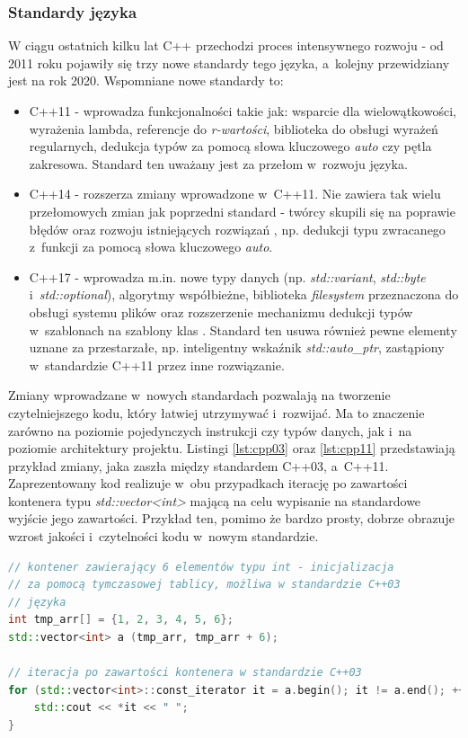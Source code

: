 \subsubsection*{Standardy języka}
W ciągu ostatnich kilku lat C++ przechodzi proces intensywnego rozwoju - od 2011 roku pojawiły się trzy nowe standardy tego języka, a~kolejny przewidziany jest na rok 2020. Wspomniane nowe standardy to:
\begin{itemize}
\item C++11 - wprowadza funkcjonalności takie jak: wsparcie dla wielowątkowości, wyrażenia lambda, referencje do \textit{r-wartości}, biblioteka do obsługi wyrażeń regularnych, dedukcja typów za pomocą słowa kluczowego \textit{auto} czy pętla zakresowa. Standard ten uważany jest za przełom w~rozwoju języka.
\item C++14 - rozszerza zmiany wprowadzone w~C++11. Nie zawiera tak wielu przełomowych zmian jak poprzedni standard - twórcy skupili się na poprawie błędów oraz rozwoju istniejących rozwiązań \cite{Cpp14Wikipedia}, np. dedukcji typu zwracanego z~funkcji za pomocą słowa kluczowego \textit{auto}.
\item C++17 - wprowadza m.in. nowe typy danych (np. \textit{std::variant}, \textit{std::byte} i~\textit{std::optional}), algorytmy współbieżne, biblioteka \textit{filesystem} przeznaczona do obsługi systemu plików oraz rozszerzenie mechanizmu dedukcji typów w~szablonach na szablony klas \cite{BartekCodingBlogCpp17}. Standard ten usuwa również pewne elementy uznane za przestarzałe, np. inteligentny wskaźnik \textit{std::auto\_ptr}, zastąpiony w~standardzie C++11 przez inne rozwiązanie.
\end{itemize} 
Zmiany wprowadzane w~nowych standardach pozwalają na tworzenie czytelniejszego kodu, który łatwiej utrzymywać i~rozwijać. Ma to znaczenie zarówno na poziomie pojedynczych instrukcji czy typów danych, jak i~na poziomie architektury projektu. Listingi \ref{lst:cpp03} oraz \ref{lst:cpp11} przedstawiają przykład zmiany, jaka zaszła między standardem C++03, a~C++11. Zaprezentowany kod realizuje w~obu przypadkach iterację po zawartości kontenera typu \textit{std::vector<int>} mającą na celu wypisanie na standardowe wyjście jego zawartości. Przykład ten, pomimo że bardzo prosty, dobrze obrazuje wzrost jakości i~czytelności kodu w~nowym standardzie.

\begin{lstlisting}[language=c++,caption={Przykład kodu w~języku C++ napisany z~wykorzystaniem standardu C++03},label={lst:cpp03}]
// kontener zawierający 6 elementów typu int - inicjalizacja
// za pomocą tymczasowej tablicy, możliwa w standardzie C++03
// języka
int tmp_arr[] = {1, 2, 3, 4, 5, 6};
std::vector<int> a (tmp_arr, tmp_arr + 6);

// iteracja po zawartości kontenera w standardzie C++03
for (std::vector<int>::const_iterator it = a.begin(); it != a.end(); ++it) {
    std::cout << *it << " ";
}
\end{lstlisting}

